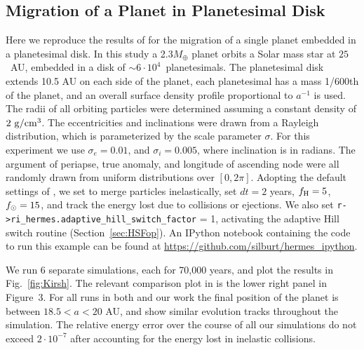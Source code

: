 \subsection{Migration of a Planet in Planetesimal Disk \citep{Kirsh2009} }
Here we reproduce the results of \citet{Kirsh2009} for the migration of a single planet embedded in a planetesimal disk. 
In this study a 2.3$M_{\oplus}$ planet orbits a Solar mass star at $25$~AU, embedded in a disk of $\sim6\cdot10^4$~planetesimals. 
The planetesimal disk extends 10.5 AU on each side of the planet, each planetesimal has a mass 1/600th of the planet, and an overall surface density profile proportional to $a^{-1}$ is used.
The radii of all orbiting particles were determined assuming a constant density of $2~\rm{ g/cm^3}$.
The eccentricities and inclinations were drawn from a Rayleigh distribution, which is parameterized by the scale parameter $\sigma$.
For this experiment we use $\sigma_e = 0.01$, and $\sigma_i = 0.005$, where inclination is in radians.
The argument of periapse, true anomaly, and longitude of ascending node were all randomly drawn from uniform distributions over $[0, 2\pi]$.
Adopting the default settings of \citet{Kirsh2009}, we set \hermes to merge particles inelastically, set $dt=2$ years, $f_{\rm H} = 5$, $f_{\rm \odot} = 15$, and track the energy lost due to collisions or ejections. 
We also set {\sc \tt r->ri\_hermes.adaptive\_hill\_switch\_factor} = 1, activating the adaptive Hill switch routine (Section~\ref{sec:HSFop}).
An IPython notebook containing the code to run this example can be found at \url{https://github.com/silburt/hermes_ipython}.

We run 6 separate simulations, each for 70,000 years, and plot the results in Fig.~\ref{fig:Kirsh}.
The relevant comparison plot in \citet{Kirsh2009} is the lower right panel in Figure~3.
For all runs in both \citet{Kirsh2009} and our work the final position of the planet is between $18.5 < a < 20$ AU, and show similar evolution tracks throughout the simulation. 
The relative energy error over the course of all our simulations do not exceed $2\cdot10^{-7}$ after accounting for the energy lost in inelastic collisions. 

